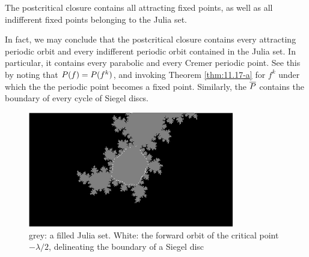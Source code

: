 \documentclass[../main.tex]{subfiles}
\newcommand\postcrit[1]{P\if\relax\detokenize{#1}\relax\else(#1)\fi}
\newcommand\postcl[1]{\cl{P}\if\relax\detokenize{#1}\relax\else(#1)\fi}
\begin{document}
\begin{thm}\label{thm:11.17-a}
The postcritical closure contains all attracting fixed points, as well as all indifferent fixed points belonging to the Julia set.
\end{thm}

\begin{rmk}
In fact, we may conclude that the postcritical closure contains every attracting periodic orbit and every indifferent periodic orbit contained in the Julia set. In particular, it contains every parabolic and every Cremer periodic point. See this by noting that $\postcrit{f} = \postcrit{f^k}$, and invoking Theorem \ref{thm:11.17-a} for $f^k$ under which the the periodic point becomes a fixed point. Similarly, the $\postcl{}$ contains the boundary of every cycle of Siegel discs.
\end{rmk}

\begin{figure}[h]{\centering
\includegraphics[width=0.8\textwidth]{../resources/ch-11/postcrit.png}
\caption{grey: a filled Julia set. White: the forward orbit of the critical point $-\lambda/2$, delineating the boundary of a Siegel disc
}}
\end{figure}
\end{document}
